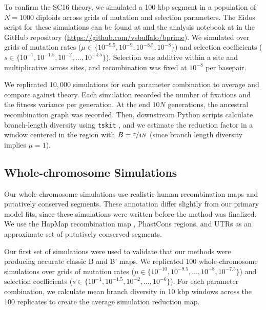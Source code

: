 \documentclass[11pt]{article}
\begin{document}
To confirm the SC16 theory, we simulated a 100 kbp segment in a population of
$N=1000$ diploids across grids of mutation and selection parameters. The Eidos
script for these simulations can be found at
 and the analysis notebook at
 in the GitHub repository
(\url{https://github.com/vsbuffalo/bprime}). We simulated over grids of
mutation rates ($\mu \in \{10^{-9.5}, 10^{-9}, 10^{-8.5}, 10^{-8}\}$) and
selection coefficients ($s \in \{10^{-1}, 10^{-1.5}, 10^{-2}, \ldots,
10^{-4.5}\}$). Selection was additive within a site and multiplicative across
sites, and recombination was fixed at $10^{-8}$ per basepair.


We replicated $10,000$ simulations for each parameter combination to average
and compare against theory. Each simulation recorded the number of fixations
and the fitness variance per generation. At the end $10N$ generations, the
ancestral recombination graph was recorded. Then, downstream Python scripts
calculate branch-length diversity using \texttt{tskit}
\parencite{Kelleher2018-qu}, and we estimate the reduction factor in a window
centered in the region with $B = \nicefrac{\pi}{4N}$ (since branch length
diversity implies $\mu=1$).

\subsection{Whole-chromosome Simulations}

Our whole-chromosome simulations use realistic human recombination maps and
putatively conserved segments. These annotation differ slightly from our
primary model fits, since these simulations were written before the method was
finalized. We use the HapMap recombination map
\parencite{International_HapMap_Consortium2007-nu}, PhastCons regions, and UTRs
as an approximate set of putatively conserved segments. 

Our first set of simulations were used to validate that our methods were
producing accurate classic B and B' maps. We replicated $100$ whole-chromosome
simulations over grids of mutation rates ($\mu \in \{10^{-10}, 10^{-9.5},
\ldots, 10^{-8}, 10^{-7.5}\}$) and selection coefficients ($s \in \{10^{-1},
10^{-1.5}, 10^{-2}, \ldots, 10^{-6}\}$). For each parameter combination, we
calculate mean branch diversity in 10 kbp windows across the 100 replicates to
create the average simulation reduction map. 
\end{document}
